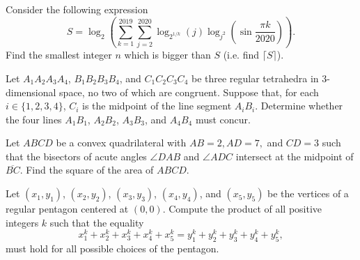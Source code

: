 \documentclass[11pt]{article}
\theoremstyle{definition}
\begin{document}
\begin{question}[name={2021 PUMaC, Algebra, \href{https://artofproblemsolving.com/community/c4p25094356}{Problem 7}}]
	Consider the following expression
	$$S = \log_2 \left( \sum^{2019}_{k=1}\sum^{2020}_{j=2}\log_{2^{1/k}} (j) \log_{j^2} \left(\sin \frac{\pi k}{2020}\right) \right).$$Find the smallest integer $n$ which is bigger than $S$ (i.e. find $\lceil S \rceil$).
\end{question}





\begin{question}[name={2021 HMIC, \href{https://artofproblemsolving.com/community/c4p21784605}{Problem 4}}]
	Let $A_1A_2A_3A_4$, $B_1B_2B_3B_4$, and $C_1C_2C_3C_4$ be three regular tetrahedra in $3$-dimensional space, no two of which are congruent. Suppose that, for each $i\in \{1,2,3,4\}$, $C_i$ is the midpoint of the line segment $A_iB_i$. Determine whether the four lines $A_1B_1$, $A_2B_2$, $A_3B_3$, and $A_4B_4$ must concur.
\end{question}



%	








\begin{question}[name={2022 AIME II, \href{https://artofproblemsolving.com/community/c4p24447159}{Problem 11}}]
	Let $ABCD$ be a convex quadrilateral with $AB=2, AD=7,$ and $CD=3$ such that the bisectors of acute angles $\angle{DAB}$ and $\angle{ADC}$ intersect at the midpoint of $\overline{BC}.$ Find the square of the area of $ABCD$.
\end{question}


%	














\begin{question}[name={2022 HMMT, Algebra \& Number Theory, \href{https://artofproblemsolving.com/community/c4p24651727}{Problem 7}}]
	Let $(x_1, y_1)$, $(x_2, y_2)$, $(x_3, y_3)$, $(x_4, y_4)$, and $(x_5, y_5)$ be the vertices of a regular pentagon centered at $(0, 0)$. Compute the product of all positive integers $k$ such that the equality $$x_1^k+x_2^k+x_3^k+x_4^k+x_5^k=y_1^k+y_2^k+y_3^k+y_4^k+y_5^k,$$ must hold for all possible choices of the pentagon.
\end{question}
\end{document}
